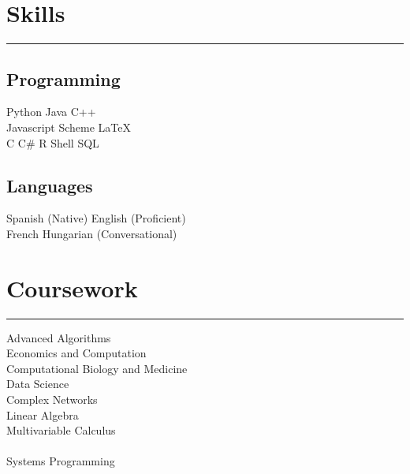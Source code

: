 \documentclass[]{dafirebanks-resume-openfont}
\begin{document}
\begin{minipage}[t]{0.33\textwidth}
\section{Skills}
\vspace{-3pt}
{\color{blue}\hrule width 45pt} \vspace{5pt}
\subsection{Programming}
 Python \textbullet{} Java \textbullet{} C++ \\ \textbullet{} Javascript \textbullet{} Scheme
\textbullet{} \LaTeX \\ \sectionsep
{}
 C \textbullet{} C\# \textbullet{} R %
 \textbullet{} Shell \textbullet{} SQL \\
\sectionsep 
\subsection{Languages}
Spanish (Native) \textbullet{} English (Proficient) \\
\textbullet{} French \textbullet{} Hungarian (Conversational)
\sectionsep



\section{Coursework}
\vspace{-3pt}
{\color{blue} \hrule width 107pt} \vspace{5pt}
Advanced Algorithms \\
Economics and Computation \\
Computational Biology and Medicine \\
Data Science\\
Complex Networks \\
Linear Algebra \\ 
Multivariable Calculus \\
 \\ 
Systems Programming \\


\end{minipage}
\end{document}
